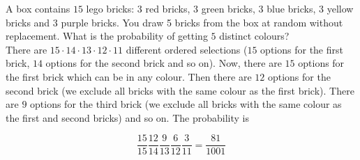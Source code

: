 \begin{texample}
	A box contains $15$ lego bricks: $3$ red bricks, $3$ green bricks, $3$ blue bricks, $3$ yellow bricks and $3$ purple bricks. You draw 5 bricks from the box at random without replacement. What is the probability of getting $5$ distinct colours? \\
	
	There are $15\cdot14\cdot13\cdot12\cdot11$ different ordered selections ($15$ options for the first brick, $14$ options for the second brick and so on). Now, there are $15$ options for the first brick which can be in any colour. Then there are $12$ options for the second brick (we exclude all bricks with the same colour as the first brick). There are $9$ options for the third brick (we exclude all bricks with the same colour as the first and second bricks) and so on. The probability is
	
	\[\frac{15}{15}\frac{12}{14}\frac{9}{13}\frac{6}{12}\frac{3}{11}=\frac{81}{1001}\]
\end{texample}

